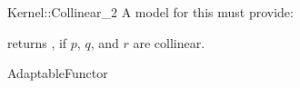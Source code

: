 \begin{ccRefFunctionObjectConcept}{Kernel::Collinear_2}
A model for this must provide:


{returns , if $p$, $q$, and $r$ are collinear.}

\ccRefines
AdaptableFunctor

\ccSeeAlso
{} \\

\end{ccRefFunctionObjectConcept}
